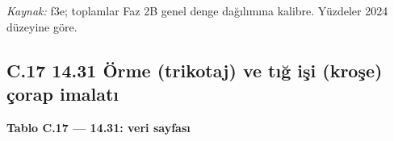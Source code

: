 \endgroup

\emph{Kaynak:} \etiketT{} f3e; toplamlar Faz 2B genel denge dağılımına kalibre. Yüzdeler 2024 düzeyine göre.

\hypertarget{nace_kartlar_13-15-c17-1431-uxf6rme-trikotaj-ve-tux131ux11f-iux15fi-kroux15fe-uxe7orap-imalatux131}{%
\subsection{C.17 14.31 Örme (trikotaj) ve tığ işi (kroşe) çorap imalatı}\label{nace_kartlar_13-15-c17-1431-uxf6rme-trikotaj-ve-tux131ux11f-iux15fi-kroux15fe-uxe7orap-imalatux131}}


\textbf{Tablo C.17 --- 14.31: veri sayfası}

\nopagebreak[4]

\begingroup\gbtablo\small

